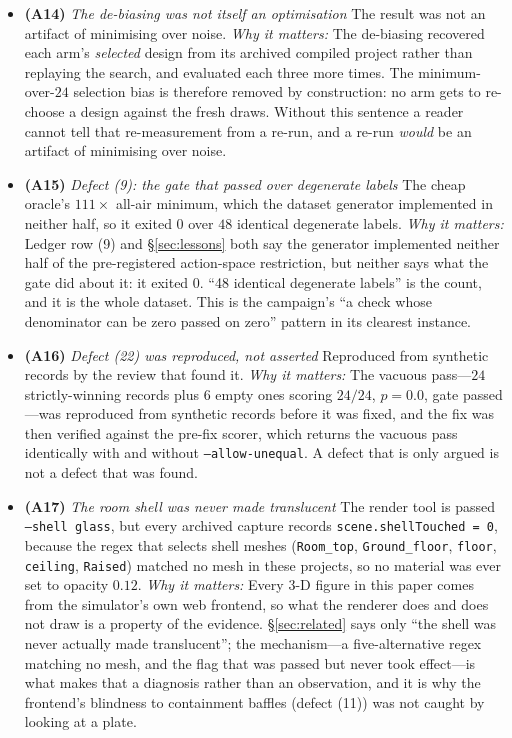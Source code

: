 \documentclass{article}
\begin{document}
\begin{itemize}
\item \textbf{(A14)} \emph{The de-biasing was not itself an optimisation}  The result was not an artifact of minimising over noise.  \emph{Why it matters:} The de-biasing recovered each arm's \emph{selected} design from its archived compiled project rather than replaying the search, and evaluated each three more times.  The minimum-over-$24$ selection bias is therefore removed by construction: no arm gets to re-choose a design against the fresh draws.  Without this sentence a reader cannot tell that re-measurement from a re-run, and a re-run \emph{would} be an artifact of minimising over noise.
\item \textbf{(A15)} \emph{Defect (9): the gate that passed over degenerate labels}  The cheap oracle's $111\times$ all-air minimum, which the dataset generator implemented in neither half, so it exited $0$ over $48$ identical degenerate labels.  \emph{Why it matters:} Ledger row (9) and \S\ref{sec:lessons} both say the generator implemented neither half of the pre-registered action-space restriction, but neither says what the gate did about it: it exited $0$.  ``48 identical degenerate labels'' is the count, and it is the whole dataset.  This is the campaign's ``a check whose denominator can be zero passed on zero'' pattern in its clearest instance.
\item \textbf{(A16)} \emph{Defect (22) was reproduced, not asserted}  Reproduced from synthetic records by the review that found it.  \emph{Why it matters:} The vacuous pass---$24$ strictly-winning records plus $6$ empty ones scoring $24/24$, $p = 0.0$, gate passed---was reproduced from synthetic records before it was fixed, and the fix was then verified against the pre-fix scorer, which returns the vacuous pass identically with and without \texttt{--allow-unequal}.  A defect that is only argued is not a defect that was found.
\item \textbf{(A17)} \emph{The room shell was never made translucent}  The render tool is passed \texttt{--shell glass}, but every archived capture records \texttt{scene.shellTouched = 0}, because the regex that selects shell meshes (\texttt{Room\_top}, \texttt{Ground\_floor}, \texttt{floor}, \texttt{ceiling}, \texttt{Raised}) matched no mesh in these projects, so no material was ever set to opacity $0.12$.  \emph{Why it matters:} Every 3-D figure in this paper comes from the simulator's own web frontend, so what the renderer does and does not draw is a property of the evidence.  \S\ref{sec:related} says only ``the shell was never actually made translucent''; the mechanism---a five-alternative regex matching no mesh, and the flag that was passed but never took effect---is what makes that a diagnosis rather than an observation, and it is why the frontend's blindness to containment baffles (defect (11)) was not caught by looking at a plate.
\end{itemize}
\end{document}
